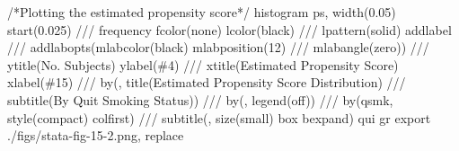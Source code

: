 \documentclass[
  10pt,
  a4paper,
]{book}
\newenvironment{Shaded}{\begin{snugshade}}{\end{snugshade}}
\newcommand{\BaseNTok}[1]{\textcolor[rgb]{0.68,0.00,0.00}{#1}}
\newcommand{\CommentTok}[1]{\textcolor[rgb]{0.37,0.37,0.37}{#1}}
\newcommand{\KeywordTok}[1]{\textcolor[rgb]{0.00,0.46,0.62}{#1}}
\newcommand{\NormalTok}[1]{\textcolor[rgb]{0.00,0.46,0.62}{#1}}
\newcounter{none} %
\begin{document}
\begin{Shaded}
\begin{Highlighting}[]
\CommentTok{/*Plotting the estimated propensity score*/}
\KeywordTok{histogram}\NormalTok{ ps, }\KeywordTok{width}\NormalTok{(0.05) }\BaseNTok{start}\NormalTok{(0.025) }\CommentTok{///}
  \KeywordTok{frequency}\NormalTok{ fcolor(}\KeywordTok{none}\NormalTok{) lcolor(}\BaseNTok{black}\NormalTok{) }\CommentTok{///}
\NormalTok{  lpattern(solid) addlabel }\CommentTok{///}
  \BaseNTok{addlabopts}\NormalTok{(}\BaseNTok{mlabcolor}\NormalTok{(}\BaseNTok{black}\NormalTok{) }\BaseNTok{mlabposition}\NormalTok{(12) }\CommentTok{///}
  \BaseNTok{mlabangle}\NormalTok{(}\BaseNTok{zero}\NormalTok{)) }\CommentTok{///}
  \BaseNTok{ytitle}\NormalTok{(No. Subjects) }\KeywordTok{ylabel}\NormalTok{(\#4) }\CommentTok{///}
  \BaseNTok{xtitle}\NormalTok{(Estimated Propensity Score) }\KeywordTok{xlabel}\NormalTok{(\#15) }\CommentTok{///}
  \KeywordTok{by}\NormalTok{(, }\BaseNTok{title}\NormalTok{(Estimated Propensity Score Distribution) }\CommentTok{///}
  \BaseNTok{subtitle}\NormalTok{(By Quit Smoking Status)) }\CommentTok{///}
  \KeywordTok{by}\NormalTok{(, }\BaseNTok{legend}\NormalTok{(}\KeywordTok{off}\NormalTok{)) }\CommentTok{///}
  \KeywordTok{by}\NormalTok{(qsmk, style(compact) colfirst) }\CommentTok{///}
  \BaseNTok{subtitle}\NormalTok{(, }\KeywordTok{size}\NormalTok{(small) box bexpand)}
\KeywordTok{qui} \KeywordTok{gr} \KeywordTok{export}\NormalTok{ ./figs/stata{-}fig{-}15{-}2.png, }\KeywordTok{replace}
\end{Highlighting}
\end{Shaded}
\end{document}
